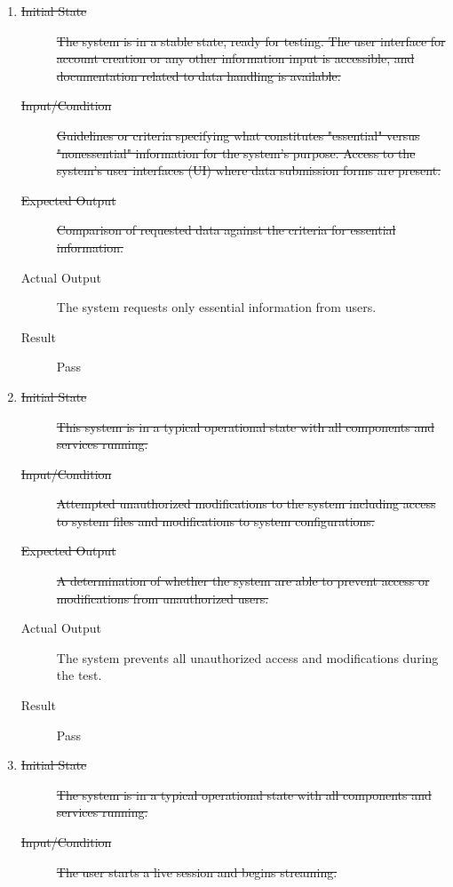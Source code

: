 \documentclass[12pt, titlepage]{article}
\begin{document}
\begin{enumerate}[NFR-T1]
\begin{description}
    \end{description}
  \addtocounter{enumi}{2}
  \item \label{NFRT22}
    \begin{description}
    \item[\sout{Initial State}]\sout{ The system is in a stable state, ready for testing. The
      user interface for account creation or any other information input is
      accessible, and documentation related to data handling is available.
    }\item[\sout{Input/Condition}]\sout{ Guidelines or criteria specifying what constitutes
      "essential" versus "nonessential" information for the system’s purpose.
      Access to the system's user interfaces (UI) where data submission forms
      are present.
    }\item[\sout{Expected Output}]\sout{ Comparison of requested data against the criteria for
      essential information.
    }\item[Actual Output] The system requests only essential information from users.
    \item[Result] Pass
    \end{description}
  \item \label{NFRT23}
    \begin{description}
    \item[\sout{Initial State}]\sout{ This system is in a typical operational state with all
      components and services running.
    }\item[\sout{Input/Condition}]\sout{ Attempted unauthorized modifications to the system
      including access to system files and modifications to system
      configurations.
    }\item[\sout{Expected Output}]\sout{ A determination of whether the system are able to
      prevent access or modifications from unauthorized users.
    }\item[Actual Output] The system prevents all unauthorized access and
      modifications during the test.
    \item[Result] Pass
    \end{description}
  \item \label{NFRT24}
    \begin{description}
    \item[\sout{Initial State}]\sout{ The system is in a typical operational state with all
      components and services running.
    }\item[\sout{Input/Condition}]\sout{ The user starts a live session and begins streaming.
}
\end{description}
\end{enumerate}
\end{document}
